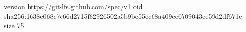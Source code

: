 version https://git-lfs.github.com/spec/v1
oid sha256:1638c068c7c66d2715f82926502a5b9be55ec68a409ee6709043ce59d2df671e
size 75
